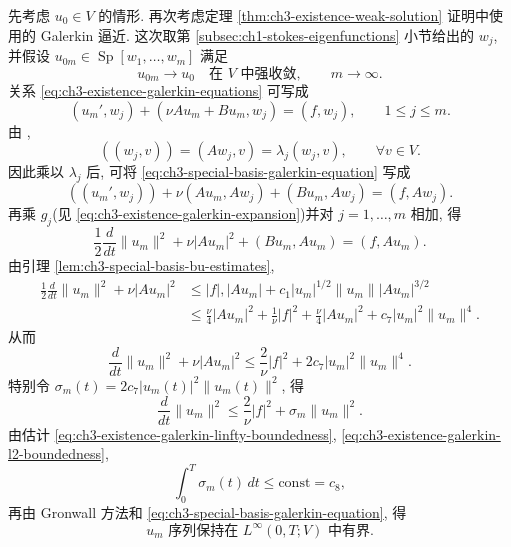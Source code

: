 \begin{Proof}
先考虑 $u_0\in V$ 的情形. 再次考虑定理 \ref{thm:ch3-existence-weak-solution} 证明中使用的 Galerkin 逼近. 这次取第 \ref{subsec:ch1-stokes-eigenfunctions} 小节给出的 $w_j$, 并假设 $u_{0m}\in\operatorname{Sp}[w_1,\ldots,w_m]$ 满足
\[
u_{0m}\longrightarrow u_0\quad\text{在 }V\text{ 中强收敛},
\qquad m\to\infty.
\]
关系 \eqref{eq:ch3-existence-galerkin-equations} 可写成
\begin{equation}
(u_m',w_j)+(\nu Au_m+Bu_m,w_j)=(f,w_j),
\qquad1\leq j\leq m.
\label{eq:ch3-special-basis-galerkin-equation}
\end{equation}
由 ,
\begin{equation}
((w_j,v))=(Aw_j,v)=\lambda_j(w_j,v),
\qquad\forall v\in V.
\label{eq:ch3-special-basis-eigenfunction-identity}
\end{equation}
因此乘以 $\lambda_j$ 后, 可将 \eqref{eq:ch3-special-basis-galerkin-equation} 写成
\[
((u_m',w_j))+\nu(Au_m,Aw_j)+(Bu_m,Aw_j)=(f,Aw_j).
\]
再乘 $g_j$(见 \eqref{eq:ch3-existence-galerkin-expansion})并对 $j=1,\ldots,m$ 相加, 得
\begin{equation}
\frac12\frac d{dt}\lVert u_m\rVert^2
+\nu|Au_m|^2+(Bu_m,Au_m)=(f,Au_m).
\label{eq:ch3-special-basis-higher-energy-identity}
\end{equation}
由引理 \ref{lem:ch3-special-basis-bu-estimates},
\[
\begin{aligned}
\frac12\frac d{dt}\lVert u_m\rVert^2+\nu|Au_m|^2
&\leq|f|,|Au_m|+c_1|u_m|^{1/2}\lVert u_m\rVert|Au_m|^{3/2}\\
&\leq\frac\nu4|Au_m|^2+\frac1\nu|f|^2
+\frac\nu4|Au_m|^2+c_7|u_m|^2\lVert u_m\rVert^4.
\end{aligned}
\]
从而
\begin{equation}
\frac d{dt}\lVert u_m\rVert^2+\nu|Au_m|^2
\leq\frac2\nu|f|^2+2c_7|u_m|^2\lVert u_m\rVert^4.
\label{eq:ch3-special-basis-2d-higher-energy-inequality}
\end{equation}
特别令 $\sigma_m(t)=2c_7|u_m(t)|^2\lVert u_m(t)\rVert^2$, 得
\[
\frac d{dt}\lVert u_m\rVert^2
\leq\frac2\nu|f|^2+\sigma_m\lVert u_m\rVert^2.
\]
由估计 \eqref{eq:ch3-existence-galerkin-linfty-boundedness}, \eqref{eq:ch3-existence-galerkin-l2-boundedness},
\[
\int_0^T\sigma_m(t)\,dt\leq\mathrm{const}=c_8,
\]
再由 Gronwall 方法和 \eqref{eq:ch3-special-basis-galerkin-equation}, 得
\begin{equation}
u_m\text{ 序列保持在 }L^\infty(0,T;V)\text{ 中有界}.
\label{eq:ch3-special-basis-2d-v-linfty-boundedness}
\end{equation}


\end{Proof}
